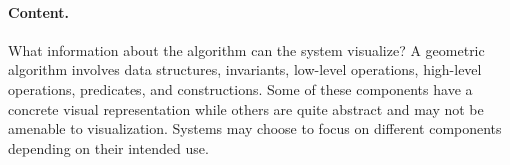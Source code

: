 
\paragraph{Content.} What information about the algorithm can the system
visualize? A geometric algorithm involves data structures, invariants, low-level
operations, high-level operations, predicates, and constructions. Some of
these components have a concrete visual representation while others are quite
abstract and may not be amenable to visualization. Systems may choose to focus
on different components depending on their intended use.

